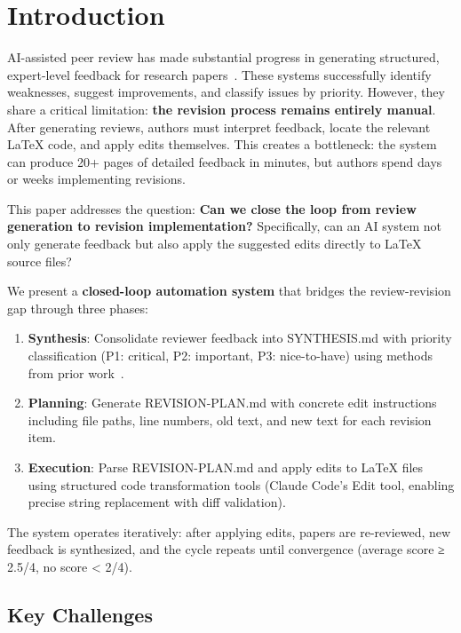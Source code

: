 \section{Introduction}

AI-assisted peer review has made substantial progress in generating structured, expert-level feedback for research papers~\cite{dellalibera2026review,damour2023simulated}. These systems successfully identify weaknesses, suggest improvements, and classify issues by priority. However, they share a critical limitation: \textbf{the revision process remains entirely manual}. After generating reviews, authors must interpret feedback, locate the relevant LaTeX code, and apply edits themselves. This creates a bottleneck: the system can produce 20+ pages of detailed feedback in minutes, but authors spend days or weeks implementing revisions.

This paper addresses the question: \textbf{Can we close the loop from review generation to revision implementation?} Specifically, can an AI system not only generate feedback but also apply the suggested edits directly to LaTeX source files?

We present a \textbf{closed-loop automation system} that bridges the review-revision gap through three phases:

\begin{enumerate}
\item \textbf{Synthesis}: Consolidate reviewer feedback into SYNTHESIS.md with priority classification (P1: critical, P2: important, P3: nice-to-have) using methods from prior work~\cite{dellalibera2026synthesis}.

\item \textbf{Planning}: Generate REVISION-PLAN.md with concrete edit instructions including file paths, line numbers, old text, and new text for each revision item.

\item \textbf{Execution}: Parse REVISION-PLAN.md and apply edits to LaTeX files using structured code transformation tools (Claude Code's Edit tool, enabling precise string replacement with diff validation).
\end{enumerate}

The system operates iteratively: after applying edits, papers are re-reviewed, new feedback is synthesized, and the cycle repeats until convergence (average score ≥ 2.5/4, no score < 2/4).

\subsection{Key Challenges}

